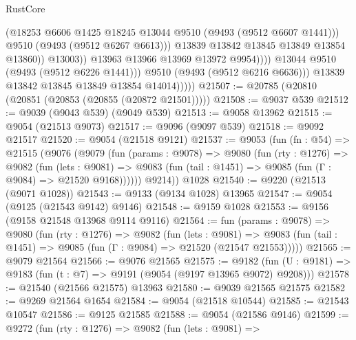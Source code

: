 \begin{lexlean}{RustCore}
\begin{coremodule}
                                    (@18253
                                      @6606
                                      @1425
                                      @18245
                                      @13044
                                      @9510
                                      (@9493 (@9512 @6607 @1441)))
                                    @9510
                                    (@9493 (@9512 @6267 @6613)))
                                  @13839
                                  @13842
                                  @13845
                                  @13849
                                  @13854
                                  @13860))
                              @13003))
                          @13963
                          @13966
                          @13969
                          @13972
                          @9954))))
                  @13044
                  @9510
                  (@9493 (@9512 @6226 @1441)))
                @9510
                (@9493 (@9512 @6216 @6636)))
              @13839
              @13842
              @13845
              @13849
              @13854
              @14014)))))
@21507 := @20785 (@20810 (@20851 (@20853 (@20855 (@20872 @21501)))))
@21508 := @9037 @539
@21512 := @9039 (@9043 @539) (@9049 @539)
@21513 := @9058 @13962
@21515 := @9054 (@21513 @9073)
@21517 := @9096 (@9097 @539)
@21518 := @9092 @21517
@21520 := @9054 (@21518 @9121)
@21537 := @9053
    (fun (fn : @54) =>
    @21515
      (@9076
        (@9079
          (fun (params : @9078) =>
          @9080
            (fun (rty : @1276) =>
            @9082
              (fun (lets : @9081) =>
              @9083 (fun (tail : @1451) => @9085 (fun (Γ : @9084) => @21520 @9168))))))
        @9214))
    @1028
@21540 := @9220 (@21513 (@9071 @1028))
@21543 := @9133 (@9134 @1028) @13965
@21547 := @9054 (@9125 (@21543 @9142) @9146)
@21548 := @9159 @1028
@21553 := @9156 (@9158 @21548 @13968 @9114 @9116)
@21564 := fun (params : @9078) =>
  @9080
    (fun (rty : @1276) =>
    @9082
      (fun (lets : @9081) =>
      @9083 (fun (tail : @1451) => @9085 (fun (Γ : @9084) => @21520 (@21547 @21553)))))
@21565 := @9079 @21564
@21566 := @9076 @21565
@21575 := @9182
    (fun (U : @9181) => @9183 (fun (t : @7) => @9191 (@9054 (@9197 @13965 @9072) @9208)))
@21578 := @21540 (@21566 @21575) @13963
@21580 := @9039 @21565 @21575
@21582 := @9269 @21564 @1654
@21584 := @9054 (@21518 @10544)
@21585 := @21543 @10547
@21586 := @9125 @21585
@21588 := @9054 (@21586 @9146)
@21599 := @9272
    (fun (rty : @1276) =>
    @9082
      (fun (lets : @9081) =>

\end{coremodule}
\end{lexlean}
